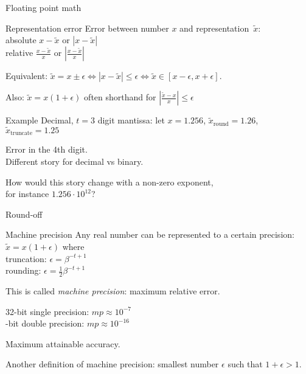  {Floating point math}

\begin{numberedframe}{Representation error}
Error between number $x$ and representation~$\tilde x$:\\
absolute $x-\tilde x$ or $|x-\tilde x|$\\
relative $\frac{x-\tilde x}{x}$ or $\left|\frac{x-\tilde x}{x}\right|$

Equivalent: $\tilde x=x\pm\epsilon\Leftrightarrow |x-\tilde
x|\leq\epsilon \Leftrightarrow \tilde x\in[x-\epsilon,x+\epsilon]$.

Also: $\tilde x =x(1+\epsilon)$ often shorthand for
$\left|\frac{\tilde x-x}{x}\right|\leq \epsilon$
\end{numberedframe}

\begin{numberedframe}{Example}
Decimal, $t=3$ digit mantissa: let $x=1.256$, $\tilde
x_{\mathrm{round}}=1.26$, $\tilde x_{\mathrm{truncate}}=1.25$

Error in the 4th digit.\\
Different story for decimal vs binary.

How would this story change with a non-zero exponent,\\
for instance $1.256\cdot 10^{12}$?
\end{numberedframe}


\begin{exercise}{Round-off}
  

\end{exercise}
\begin{answer}
\end{answer}

\begin{numberedframe}{Machine precision}
  Any real number can be represented to a certain precision:
  $\tilde x=x(1+\epsilon)$ where\\
  truncation: $\epsilon=\beta^{-t+1}$\\
  rounding: $\epsilon=\frac12 \beta^{-t+1}$

  This is called \emph{machine precision}: maximum relative error.

  32-bit single precision: $mp\approx10^{-7}$\\ -bit double precision: $mp\approx10^{-16}$
  
  Maximum attainable accuracy.
  
  Another definition of machine precision: smallest number $\epsilon$ such that
  $1+\epsilon>1$.
\end{numberedframe}

